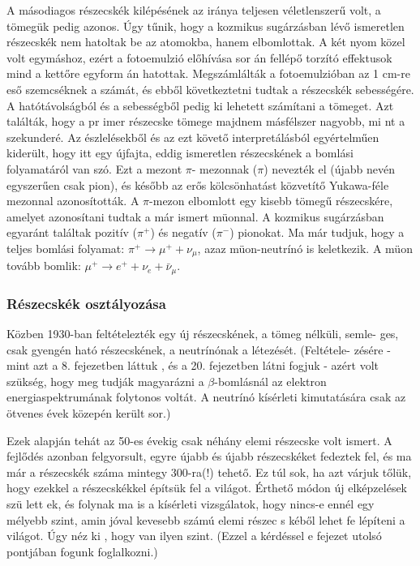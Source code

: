 \documentclass[../main.tex]{subfiles}
\begin{document}
A másodiagos részecskék kilépésének az iránya teljesen véletlenszerű
volt, a tömegük pedig azonos. Úgy tűnik, hogy a kozmikus sugárzásban lévő
ismeretlen részecskék nem hatoltak be az atomokba, hanem elbomlottak.
A két nyom közel volt egymáshoz, ezért a fotoemulzió előhívása sor án fellépő
torzító effektusok mind a kettőre egyform án hatottak. Megszámlálták a
fotoemulzióban az 1 cm-re eső szemcséknek a számát, és ebből következtetni
tudtak a részecskék sebességére. A hatótávolságból és a sebességből pedig ki
lehetett számítani a tömeget. Azt találták, hogy a pr imer részecske tömege
majdnem másfélszer nagyobb, mi nt a szekunderé. Az észlelésekből és az ezt
követő interpretálásból egyértelműen kiderült, hogy itt egy újfajta, eddig
ismeretlen részecskének a bomlási folyamatáról van szó. Ezt a mezont $\pi$-
mezonnak ($\pi$) nevezték el (újabb nevén egyszerűen csak pion), és később az
erős kölcsönhatást közvetítő Yukawa-féle mezonnal azonosították.
A $\pi$-mezon elbomlott egy kisebb tömegű részecskére, amelyet azonosítani tudtak a már ismert müonnal. A kozmikus sugárzásban egyaránt találtak pozitív ($\pi^+$) és negatív ($\pi^-$) pionokat. Ma már tudjuk, hogy a teljes
bomlási folyamat: $\pi^+ \rightarrow \mu^+ + \nu_\mu$, azaz müon-neutrínó is keletkezik. A müon tovább bomlik: $\mu^+ \rightarrow e^+ + \nu_e + \bar{\nu}_\mu$.

\subsubsection{Részecskék osztályozása}
Közben 1930-ban feltételezték egy új részecskének, a tömeg nélküli, semle-
ges, csak gyengén ható részecskének, a neutrínónak a létezését. (Feltétele-
zésére - mint azt a 8. fejezetben láttuk , és a 20. fejezetben látni fogjuk -
azért volt szükség, hogy meg tudják magyarázni a $\beta$-bomlásnál az elektron
energiaspektrumának folytonos voltát. A neutrínó kísérleti kimutatására
csak az ötvenes évek közepén került sor.)

Ezek alapján tehát az 50-es évekig csak néhány elemi részecske volt
ismert. A fejlődés azonban felgyorsult, egyre újabb és újabb részecskéket
fedeztek fel, és ma már a részecskék száma mintegy 300-ra(!) tehető. Ez
túl sok, ha azt várjuk tőlük, hogy ezekkel a részecskékkel építsük fel a
világot. Érthető módon új elképzelések szü lett ek, és folynak ma is a kísérleti
vizsgálatok, hogy nincs-e ennél egy mélyebb szint, amin jóval kevesebb
számú elemi részec s kéből lehet fe lépíteni a világot. Úgy néz ki , hogy van
ilyen szint. (Ezzel a kérdéssel e fejezet utolsó pontjában fogunk foglalkozni.)
\end{document}
